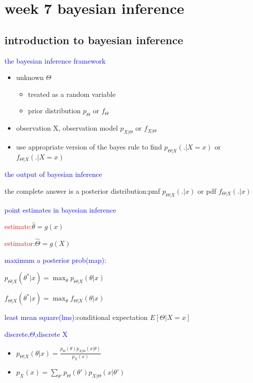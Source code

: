\section*{week 7 bayesian inference}

\subsection*{introduction to bayesian inference}


\textcolor{blue}{the bayesian inference framework}
\begin{itemize}
    \item unknown $\Theta$
    \begin{itemize}
        \item treated as a random variable
        \item prior distribution $p_\Theta$ or $f_\Theta$
    \end{itemize}
    \item observation X, observation model $p_{X|\Theta}$ or $f_{X|\Theta}$
    \item use appropriate version of the bayes rule to find $p_{\Theta|X}(.|X=x)$ or $f_{\Theta|X}(.|X=x)$ 
\end{itemize}


\textcolor{blue}{the output of bayesian inference}

the complete answer is a posterior distribution:pmf $p_{\Theta|X}(.|x)$ or pdf $f_{\Theta|X}(.|x)$


\textcolor{blue}{point estimates in bayesian inference}

\textcolor{red}{estimate:}$\hat{\theta}=g(x)$

\textcolor{red}{estimator:}$\hat{\Theta}=g(X)$

\textcolor{blue}{maximum a posterior prob(map)}:

$p_{\Theta|X}(\theta^*|x)=\max_\theta p_{\Theta|X}(\theta|x)$

$f_{\Theta|X}(\theta^*|x)=\max_\theta f_{\Theta|X}(\theta|x)$

\textcolor{blue}{least mean square(lms):}conditional expectation
$E[\Theta|X=x]$

\textcolor{blue}{discrete,$\Theta$,discrete X}



\begin{itemize}
    \item $p_{\Theta|X}(\theta|x)=\frac{p_\Theta(\theta)p_{X|\Theta}(x|\theta)}{p_X(x)}$
    \item $p_X(x)=\sum_{\theta'}p_{\Theta}(\theta')p_{X|\Theta}(x|\theta')$
\end{itemize}


